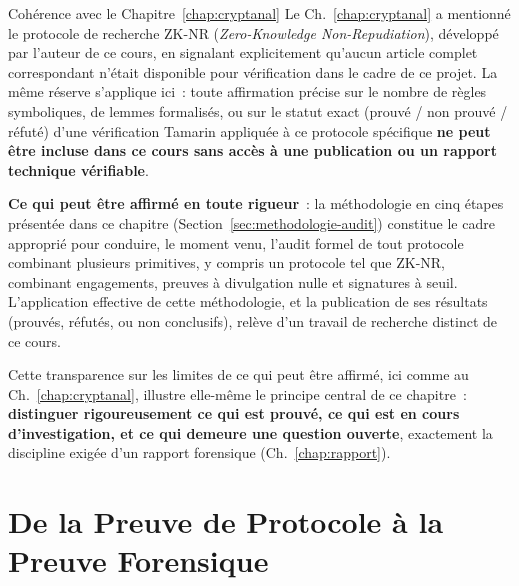 \begin{boiteRemarque}{Cohérence avec le Chapitre~\ref{chap:cryptanal}}
Le Ch.~\ref{chap:cryptanal} a mentionné le protocole de recherche
ZK-NR (\textit{Zero-Knowledge Non-Repudiation}), développé par
l'auteur de ce cours, en signalant explicitement qu'aucun article
complet correspondant n'était disponible pour vérification dans le
cadre de ce projet. La même réserve s'applique ici~: toute
affirmation précise sur le nombre de règles symboliques, de lemmes
formalisés, ou sur le statut exact (prouvé / non prouvé / réfuté)
d'une vérification Tamarin appliquée à ce protocole spécifique
\textbf{ne peut être incluse dans ce cours sans accès à une
publication ou un rapport technique vérifiable}.

\textbf{Ce qui peut être affirmé en toute rigueur}~: la méthodologie
en cinq étapes présentée dans ce chapitre (Section~\ref{sec:methodologie-audit})
constitue le cadre approprié pour conduire, le moment venu, l'audit
formel de tout protocole combinant plusieurs primitives, y compris
un protocole tel que ZK-NR, combinant engagements, preuves à
divulgation nulle et signatures à seuil. L'application effective
de cette méthodologie, et la publication de ses résultats
(prouvés, réfutés, ou non conclusifs), relève d'un travail de
recherche distinct de ce cours.

Cette transparence sur les limites de ce qui peut être affirmé,
ici comme au Ch.~\ref{chap:cryptanal}, illustre elle-même le
principe central de ce chapitre~: \textbf{distinguer rigoureusement
ce qui est prouvé, ce qui est en cours d'investigation, et ce qui
demeure une question ouverte}, exactement la discipline exigée
d'un rapport forensique (Ch.~\ref{chap:rapport}).
\end{boiteRemarque}

\section{De la Preuve de Protocole à la Preuve Forensique}
\label{sec:preuve-protocole-forensique}

